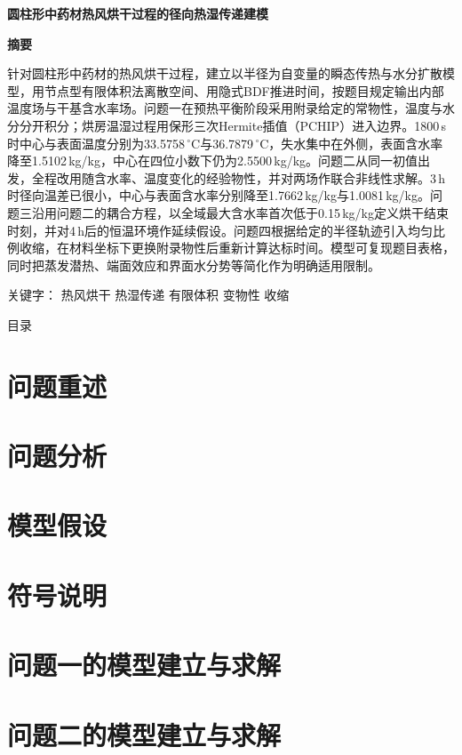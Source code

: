 \documentclass[UTF8, fontset=fandol, 12pt, a4paper]{ctexart}
\makeatletter
\newcommand{\papertitle}[1]{%
  \thispagestyle{empty}%
  \begin{center}
    {\fontsize{17.3pt}{22pt}\bfseries #1}
  \end{center}
  \vspace{1em}
}
\newcommand{\abstractcn}[2]{%
  \thispagestyle{empty}%
  \begin{center}{\fontsize{14pt}{17pt}\bfseries 摘要}\end{center}
  #1\par
  \vspace{1em}
  {\heiti 关键字：}#2\par
  \newpage
}
\newcommand{\tocpage}{%
  \setcounter{page}{1}%
  \begin{center}
    {\fontsize{17.3pt}{20.8pt}\heiti 目录}
  \end{center}
  \vspace{0.5em}
  \@starttoc{toc}%
  \newpage
}
\makeatother
\begin{document}
\papertitle{圆柱形中药材热风烘干过程的径向热湿传递建模}

\abstractcn{%
针对圆柱形中药材的热风烘干过程，建立以半径为自变量的瞬态传热与水分扩散模型，用节点型有限体积法离散空间、用隐式BDF推进时间，按题目规定输出内部温度场与干基含水率场。问题一在预热平衡阶段采用附录给定的常物性，温度与水分分开积分；烘房温湿过程用保形三次Hermite插值（PCHIP）进入边界。1800\,s时中心与表面温度分别为33.5758\,$^\circ$C与36.7879\,$^\circ$C，失水集中在外侧，表面含水率降至1.5102\,kg/kg，中心在四位小数下仍为2.5500\,kg/kg。问题二从同一初值出发，全程改用随含水率、温度变化的经验物性，并对两场作联合非线性求解。3\,h时径向温差已很小，中心与表面含水率分别降至1.7662\,kg/kg与1.0081\,kg/kg。问题三沿用问题二的耦合方程，以全域最大含水率首次低于0.15\,kg/kg定义烘干结束时刻，并对4\,h后的恒温环境作延续假设。问题四根据给定的半径轨迹引入均匀比例收缩，在材料坐标下更换附录物性后重新计算达标时间。模型可复现题目表格，同时把蒸发潜热、端面效应和界面水分势等简化作为明确适用限制。%
}{%
热风烘干 \quad 热湿传递 \quad 有限体积 \quad 变物性 \quad 收缩}

\tocpage

\section{问题重述}


\section{问题分析}


\section{模型假设}


\section{符号说明}


\section{问题一的模型建立与求解}


\section{问题二的模型建立与求解}

\end{document}
